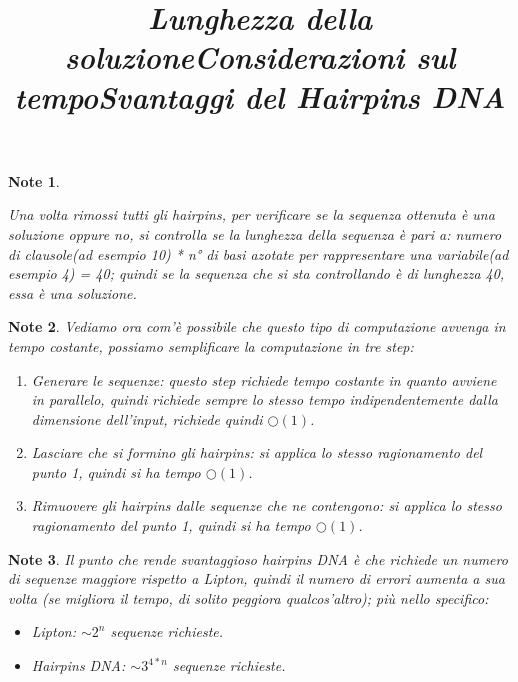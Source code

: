 \documentclass[12pt,a4paper]{report}
\newtheorem{note}{Note}[section]
\begin{document}
\begin{note}
\title{\emph{Lunghezza della soluzione}}
\label{nota - lunghezza della soluzione}

Una volta rimossi tutti gli hairpins, per verificare se la sequenza ottenuta è una soluzione oppure no, si controlla se la lunghezza della sequenza è pari a: numero di clausole(ad esempio 10) * n° di basi azotate per rappresentare una variabile(ad esempio 4) = 40; quindi se la sequenza che si sta controllando è di lunghezza 40, essa è una soluzione.
\end{note}

\begin{note}
\title{\emph{Considerazioni sul tempo}}
Vediamo ora com'è possibile che questo tipo di computazione avvenga in tempo costante, possiamo semplificare la computazione in tre step:
\begin{enumerate}
\item Generare le sequenze: questo step richiede tempo costante in quanto avviene in parallelo, quindi richiede sempre lo stesso tempo indipendentemente dalla dimensione dell'input, richiede quindi $\bigcirc(1)$.
\item Lasciare che si formino gli hairpins: si applica lo stesso ragionamento del punto 1, quindi si ha tempo $\bigcirc(1)$.
\item Rimuovere gli hairpins dalle sequenze che ne contengono: si applica lo stesso ragionamento del punto 1, quindi si ha tempo $\bigcirc(1)$.
\end{enumerate}
\end{note}

\begin{note}
\title{\emph{Svantaggi del Hairpins DNA}}

Il punto che rende svantaggioso hairpins DNA è che richiede un numero di sequenze maggiore rispetto a Lipton, quindi il numero di errori aumenta a sua volta (se migliora il tempo, di solito peggiora qualcos'altro); più nello specifico:
\begin{itemize}
\item Lipton: $ \sim 2^{n}$ sequenze richieste.
\item Hairpins DNA: $ \sim 3^{4*n}$ sequenze richieste.
\end{itemize}
\end{note}
\end{document}

